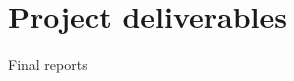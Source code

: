 \documentclass[11pt,fleqn,twoside]{article}
\begin{document}
\section{Project deliverables}
\begin{description}
  \item[Final reports]
\end{description}
%
%
%
%
%
%



\nocite{*} %

{} 
\end{document}
